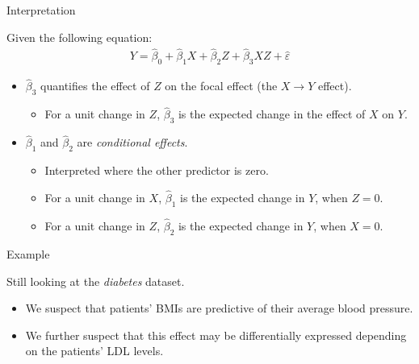 \documentclass{beamer}\usepackage[]{graphicx}\usepackage[]{color}
\begin{document}
\begin{frame}{Interpretation}
  
  Given the following equation:
  \begin{align*}
    Y = \hat{\beta}_0 + \hat{\beta}_1X + \hat{\beta}_2Z + \hat{\beta}_3XZ + 
    \hat{\varepsilon}
  \end{align*}
  \begin{itemize}
  \item $\hat{\beta}_3$ quantifies the effect of $Z$ on the focal effect (the $X 
    \rightarrow Y$ effect).
    \vc
    \begin{itemize}
    \item For a unit change in $Z$, $\hat{\beta}_3$ is the expected change in
      the effect of $X$ on $Y$.
    \end{itemize}
    \vb
  \item $\hat{\beta}_1$ and $\hat{\beta}_2$ are \emph{conditional effects}.
    \vc
    \begin{itemize}
      \item Interpreted where the other predictor is zero.
        \vc
      \item For a unit change in $X$, $\hat{\beta}_1$ is the expected change in
        $Y$, when $Z = 0$.
        \vc
      \item For a unit change in $Z$, $\hat{\beta}_2$ is the expected change in
        $Y$, when $X = 0$.
    \end{itemize}
  \end{itemize}
  
\end{frame}

  
\begin{frame}{Example}
  
  Still looking at the \emph{diabetes} dataset.
  \va 
  \begin{itemize}
  \item We suspect that patients' BMIs are predictive of their average blood 
    pressure. 
    \va 
  \item We further suspect that this effect may be differentially expressed 
    depending on the patients' LDL levels.
  \end{itemize}
  
\end{frame}

\watermarkoff%
\end{document}
